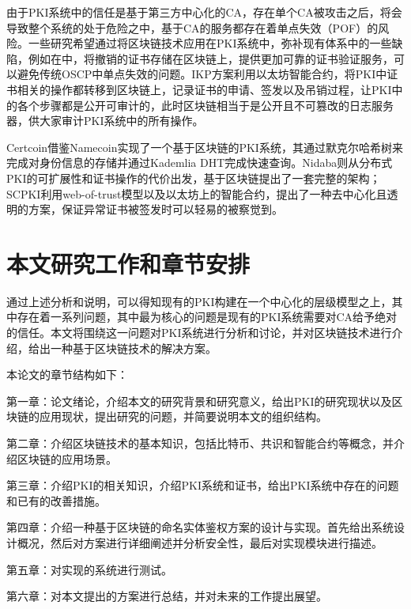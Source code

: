 由于PKI系统中的信任是基于第三方中心化的CA，存在单个CA被攻击之后，将会导致整个系统的处于危险之中，基于CA的服务都存在着单点失效（POF）的风险。一些研究希望通过将区块链技术应用在PKI系统中，弥补现有体系中的一些缺陷，例如在\parencite{baldi2017certificate}中，将撤销的证书存储在区块链上，提供更加可靠的证书验证服务，可以避免传统OSCP中单点失效的问题。IKP\supercite{matsumoto2016ikp}方案利用以太坊智能合约，将PKI中证书相关的操作都转移到区块链上，记录证书的申请、签发以及吊销过程，让PKI中的各个步骤都是公开可审计的，此时区块链相当于是公开且不可篡改的日志服务器，供大家审计PKI系统中的所有操作。



Certcoin\supercite{fromknecht2014decentralized}借鉴Namecoin实现了一个基于区块链的PKI系统，其通过默克尔哈希树来完成对身份信息的存储并通过Kademlia DHT完成快速查询。Nidaba\supercite{rystsovnidaba}则从分布式PKI的可扩展性和证书操作的代价出发，基于区块链提出了一套完整的架构；SCPKI\supercite{al2017scpki}利用web-of-trust模型以及以太坊上的智能合约，提出了一种去中心化且透明的方案，保证异常证书被签发时可以轻易的被察觉到。



\section{本文研究工作和章节安排}


通过上述分析和说明，可以得知现有的PKI构建在一个中心化的层级模型之上，其中存在着一系列问题，其中最为核心的问题是现有的PKI系统需要对CA给予绝对的信任。本文将围绕这一问题对PKI系统进行分析和讨论，并对区块链技术进行介绍，给出一种基于区块链技术的解决方案。




本论文的章节结构如下：

第一章：论文绪论，介绍本文的研究背景和研究意义，给出PKI的研究现状以及区块链的应用现状，提出研究的问题，并简要说明本文的组织结构。

第二章：介绍区块链技术的基本知识，包括比特币、共识和智能合约等概念，并介绍区块链的应用场景。

第三章：介绍PKI的相关知识，介绍PKI系统和证书，给出PKI系统中存在的问题和已有的改善措施。

第四章：介绍一种基于区块链的命名实体鉴权方案的设计与实现。首先给出系统设计概况，然后对方案进行详细阐述并分析安全性，最后对实现模块进行描述。

第五章：对实现的系统进行测试。

第六章：对本文提出的方案进行总结，并对未来的工作提出展望。



